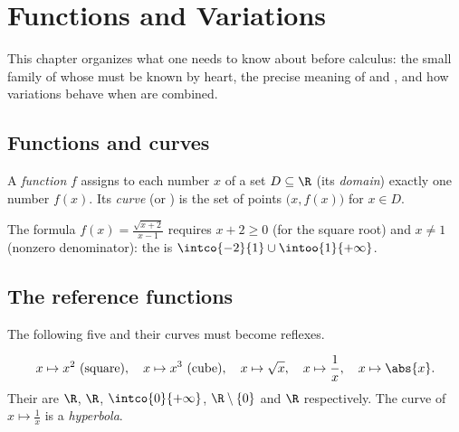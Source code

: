 \chapter{Functions and Variations}\label{ch:g11:func}

This chapter organizes what one needs to know about  before
calculus: the small family of \emph{} whose  must
be known by heart, the precise meaning of \emph{} and
\emph{}, and how variations behave when  are combined.

\section{Functions and curves}

\begin{definition}\label{def:g11:func:function}
A \emph{function} $f$ assigns to each number $x$ of a set
$D \subseteq \R$ (its \emph{domain}) exactly one number
$f(x)$. Its \emph{curve} (or ) is the set of points
$\bigl(x, f(x)\bigr)$ for $x \in D$.
\end{definition}

\begin{example}
The formula $f(x) = \frac{\sqrt{x+2}}{x-1}$ requires $x + 2 \geq 0$ (for
the square root) and $x \neq 1$ (nonzero denominator): the  is
$\intco{-2}{1} \cup \intoo{1}{+\infty}$.
\end{example}

\section{The reference functions}

The following five  and their curves must become reflexes.

\begin{definition}\label{def:g11:func:reference}
\[
x \mapsto x^2 \text{ (square)}, \quad
x \mapsto x^3 \text{ (cube)}, \quad
x \mapsto \sqrt{x}, \quad
x \mapsto \frac{1}{x}, \quad
x \mapsto \abs{x}.
\]
Their  are $\R$, $\R$, $\intco{0}{+\infty}$, $\R \setminus \{0\}$
and $\R$ respectively. The curve of $x \mapsto \frac1x$ is a
\emph{hyperbola}.
\end{definition}

